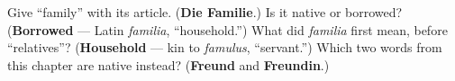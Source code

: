 \begin{tcolorbox}[breakable,colback=teal!4,colframe=teal!35!black,title={Before you move on}]
Give \textquotedblleft{}family\textquotedblright{} with its article. (\textbf{Die Familie}.) Is it native or borrowed? (\textbf{Borrowed} — Latin \emph{familia}, \textquotedblleft{}household.\textquotedblright{}) What did \emph{familia} first mean, before \textquotedblleft{}relatives\textquotedblright{}? (\textbf{Household} — kin to \emph{famulus}, \textquotedblleft{}servant.\textquotedblright{}) Which two words from this chapter are native instead? (\textbf{Freund} and \textbf{Freundin}.)
\end{tcolorbox}
